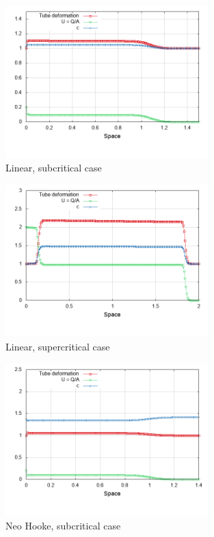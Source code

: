 \documentclass[12pt,a4paper]{article}
\numberwithin{equation}{section}
\begin{document}
\begin{figure}[H]
  \centering
    \includegraphics[width=0.7\textwidth]{Linear_Q02_sub.png}
    \caption{Linear, subcritical case}
    \label{fig:Linear_sub}
\end{figure}
\begin{figure}[H]
\centering
    \includegraphics[width=0.7\textwidth]{Linear_Q2_super.png}
    \caption{Linear, supercritical case}
    \label{fig:Linear_super}
\end{figure}
\begin{figure}[H]
  \centering
    \includegraphics[width=0.7\textwidth]{NH_Q02_sub.png}
    \caption{Neo Hooke, subcritical case}
    \label{fig:NH_sub}
\end{figure}
\end{document}
